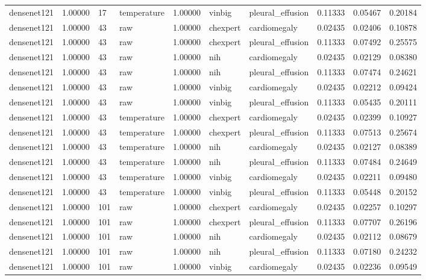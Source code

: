 \begin{tabular}{lrllrllrrr}
densenet121 & 1.00000 & 17 & temperature & 1.00000 & vinbig & pleural\_effusion & 0.11333 & 0.05467 & 0.20184 \\
densenet121 & 1.00000 & 43 & raw & 1.00000 & chexpert & cardiomegaly & 0.02435 & 0.02406 & 0.10878 \\
densenet121 & 1.00000 & 43 & raw & 1.00000 & chexpert & pleural\_effusion & 0.11333 & 0.07492 & 0.25575 \\
densenet121 & 1.00000 & 43 & raw & 1.00000 & nih & cardiomegaly & 0.02435 & 0.02129 & 0.08380 \\
densenet121 & 1.00000 & 43 & raw & 1.00000 & nih & pleural\_effusion & 0.11333 & 0.07474 & 0.24621 \\
densenet121 & 1.00000 & 43 & raw & 1.00000 & vinbig & cardiomegaly & 0.02435 & 0.02212 & 0.09424 \\
densenet121 & 1.00000 & 43 & raw & 1.00000 & vinbig & pleural\_effusion & 0.11333 & 0.05435 & 0.20111 \\
densenet121 & 1.00000 & 43 & temperature & 1.00000 & chexpert & cardiomegaly & 0.02435 & 0.02399 & 0.10927 \\
densenet121 & 1.00000 & 43 & temperature & 1.00000 & chexpert & pleural\_effusion & 0.11333 & 0.07513 & 0.25674 \\
densenet121 & 1.00000 & 43 & temperature & 1.00000 & nih & cardiomegaly & 0.02435 & 0.02127 & 0.08389 \\
densenet121 & 1.00000 & 43 & temperature & 1.00000 & nih & pleural\_effusion & 0.11333 & 0.07484 & 0.24649 \\
densenet121 & 1.00000 & 43 & temperature & 1.00000 & vinbig & cardiomegaly & 0.02435 & 0.02211 & 0.09480 \\
densenet121 & 1.00000 & 43 & temperature & 1.00000 & vinbig & pleural\_effusion & 0.11333 & 0.05448 & 0.20152 \\
densenet121 & 1.00000 & 101 & raw & 1.00000 & chexpert & cardiomegaly & 0.02435 & 0.02257 & 0.10297 \\
densenet121 & 1.00000 & 101 & raw & 1.00000 & chexpert & pleural\_effusion & 0.11333 & 0.07707 & 0.26196 \\
densenet121 & 1.00000 & 101 & raw & 1.00000 & nih & cardiomegaly & 0.02435 & 0.02112 & 0.08679 \\
densenet121 & 1.00000 & 101 & raw & 1.00000 & nih & pleural\_effusion & 0.11333 & 0.07180 & 0.24232 \\
densenet121 & 1.00000 & 101 & raw & 1.00000 & vinbig & cardiomegaly & 0.02435 & 0.02236 & 0.09549 \\

\end{tabular}

